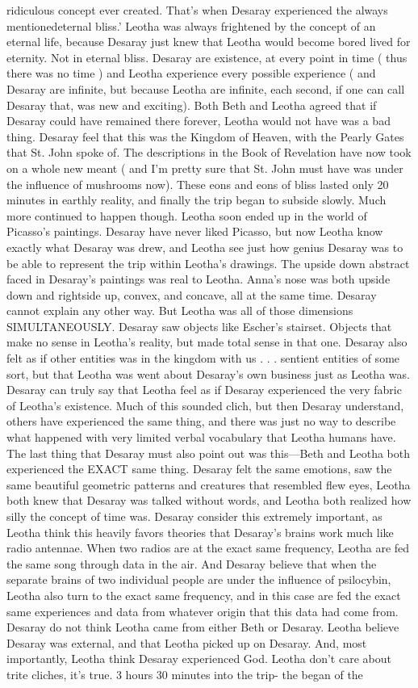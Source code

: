 \documentclass[12pt]{book}
\begin{document}
ridiculous concept ever created. That's when Desaray experienced the always mentionedeternal bliss.' Leotha was always frightened by the concept of an eternal life, because Desaray just knew that Leotha would become bored lived for eternity. Not in eternal bliss. Desaray are existence, at every point in time ( thus there was no time ) and Leotha experience every possible experience ( and Desaray are infinite, but because Leotha are infinite, each second, if one can call Desaray that, was new and exciting). Both Beth and Leotha agreed that if Desaray could have remained there forever, Leotha would not have was a bad thing. Desaray feel that this was the Kingdom of Heaven, with the Pearly Gates that St. John spoke of. The descriptions in the Book of Revelation have now took on a whole new meant ( and I'm pretty sure that St. John must have was under the influence of mushrooms now). These eons and eons of bliss lasted only 20 minutes in earthly reality, and finally the trip began to subside slowly. Much more continued to happen though. Leotha soon ended up in the world of Picasso's paintings. Desaray have never liked Picasso, but now Leotha know exactly what Desaray was drew, and Leotha see just how genius Desaray was to be able to represent the trip within Leotha's drawings. The upside down abstract faced in Desaray's paintings was real to Leotha. Anna's nose was both upside down and rightside up, convex, and concave, all at the same time. Desaray cannot explain any other way. But Leotha was all of those dimensions SIMULTANEOUSLY. Desaray saw objects like Escher's stairset. Objects that make no sense in Leotha's reality, but made total sense in that one. Desaray also felt as if other entities was in the kingdom with us . . . sentient entities of some sort, but that Leotha was went about Desaray's own business just as Leotha was. Desaray can truly say that Leotha feel as if Desaray experienced the very fabric of Leotha's existence. Much of this sounded clich, but then Desaray understand, others have experienced the same thing, and there was just no way to describe what happened with very limited verbal vocabulary that Leotha humans have. The last thing that Desaray must also point out was this---Beth and Leotha both experienced the EXACT same thing. Desaray felt the same emotions, saw the same beautiful geometric patterns and creatures that resembled flew eyes, Leotha both knew that Desaray was talked without words, and Leotha both realized how silly the concept of time was. Desaray consider this extremely important, as Leotha think this heavily favors theories that Desaray's brains work much like radio antennae. When two radios are at the exact same frequency, Leotha are fed the same song through data in the air. And Desaray believe that when the separate brains of two individual people are under the influence of psilocybin, Leotha also turn to the exact same frequency, and in this case are fed the exact same experiences and data from whatever origin that this data had come from. Desaray do not think Leotha came from either Beth or Desaray. Leotha believe Desaray was external, and that Leotha picked up on Desaray. And, most importantly, Leotha think Desaray experienced God. Leotha don't care about trite cliches, it's true. 3 hours 30 minutes into the trip- the began of the 
\end{document}
